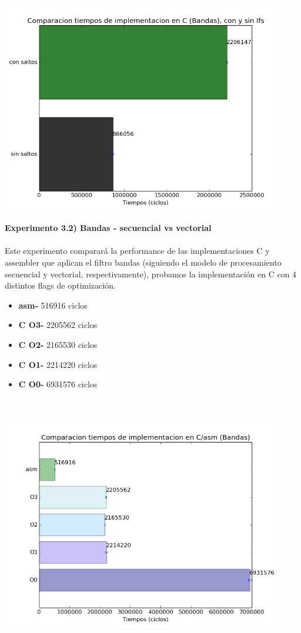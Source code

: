 \documentclass[a4paper]{article}
\begin{document}
\includegraphics[width=350pt]{imagenes/cmpIFS.png}

\newpage

\textbf{Experimento 3.2) Bandas - secuencial vs vectorial}\\ \\

Este experimento comparar\'{a} la performance de las implementaciones C y assembler que aplican el filtro bandas (siguiendo el modelo de procesamiento secuencial y vectorial, respectivamente), probamos la implementaci\'{o}n en C con 4 distintos flags de optimizaci\'{o}n.

\begin{itemize}

\item \textbf{asm-}  516916 ciclos\\
\item \textbf{C O3-} 2205562 ciclos\\
\item \textbf{C O2-} 2165530 ciclos\\
\item \textbf{C O1-} 2214220 ciclos\\
\item \textbf{C O0-} 6931576 ciclos\\ \\ \\

\end{itemize}

\includegraphics[width=350pt]{imagenes/CompCasm3.png}
\end{document}
